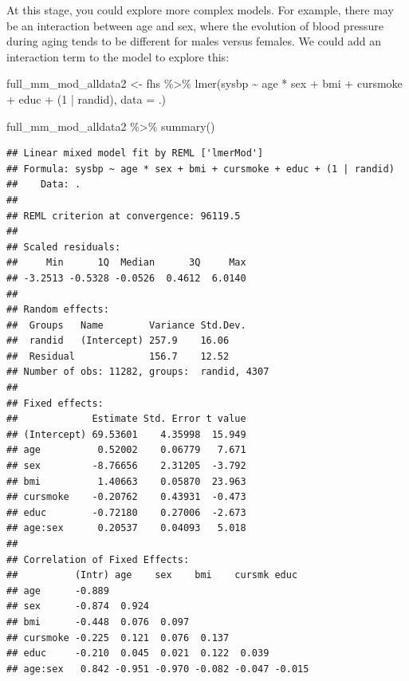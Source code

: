 \documentclass[
]{book}
\newenvironment{Shaded}{\begin{snugshade}}{\end{snugshade}}
\newcommand{\AttributeTok}[1]{\textcolor[rgb]{0.77,0.63,0.00}{#1}}
\newcommand{\DecValTok}[1]{\textcolor[rgb]{0.00,0.00,0.81}{#1}}
\newcommand{\FunctionTok}[1]{\textcolor[rgb]{0.00,0.00,0.00}{#1}}
\newcommand{\NormalTok}[1]{#1}
\newcommand{\OtherTok}[1]{\textcolor[rgb]{0.56,0.35,0.01}{#1}}
\newcommand{\SpecialCharTok}[1]{\textcolor[rgb]{0.00,0.00,0.00}{#1}}
\begin{document}
At this stage, you could explore more complex models. For example, there
may be an interaction between age and sex, where the evolution of blood pressure
during aging tends to be different for males versus females. We could add
an interaction term to the model to explore this:

\begin{Shaded}
\begin{Highlighting}[]
\NormalTok{full\_mm\_mod\_alldata2 }\OtherTok{\textless{}{-}}\NormalTok{ fhs }\SpecialCharTok{\%\textgreater{}\%} 
  \FunctionTok{lmer}\NormalTok{(sysbp }\SpecialCharTok{\textasciitilde{}}\NormalTok{ age }\SpecialCharTok{*}\NormalTok{ sex }\SpecialCharTok{+}\NormalTok{ bmi }\SpecialCharTok{+}\NormalTok{ cursmoke }\SpecialCharTok{+}\NormalTok{ educ }\SpecialCharTok{+}\NormalTok{ (}\DecValTok{1} \SpecialCharTok{|}\NormalTok{ randid), }
       \AttributeTok{data =}\NormalTok{ .) }

\NormalTok{full\_mm\_mod\_alldata2 }\SpecialCharTok{\%\textgreater{}\%} 
  \FunctionTok{summary}\NormalTok{()}
\end{Highlighting}
\end{Shaded}

\begin{verbatim}
## Linear mixed model fit by REML ['lmerMod']
## Formula: sysbp ~ age * sex + bmi + cursmoke + educ + (1 | randid)
##    Data: .
## 
## REML criterion at convergence: 96119.5
## 
## Scaled residuals: 
##     Min      1Q  Median      3Q     Max 
## -3.2513 -0.5328 -0.0526  0.4612  6.0140 
## 
## Random effects:
##  Groups   Name        Variance Std.Dev.
##  randid   (Intercept) 257.9    16.06   
##  Residual             156.7    12.52   
## Number of obs: 11282, groups:  randid, 4307
## 
## Fixed effects:
##             Estimate Std. Error t value
## (Intercept) 69.53601    4.35998  15.949
## age          0.52002    0.06779   7.671
## sex         -8.76656    2.31205  -3.792
## bmi          1.40663    0.05870  23.963
## cursmoke    -0.20762    0.43931  -0.473
## educ        -0.72180    0.27006  -2.673
## age:sex      0.20537    0.04093   5.018
## 
## Correlation of Fixed Effects:
##          (Intr) age    sex    bmi    cursmk educ  
## age      -0.889                                   
## sex      -0.874  0.924                            
## bmi      -0.448  0.076  0.097                     
## cursmoke -0.225  0.121  0.076  0.137              
## educ     -0.210  0.045  0.021  0.122  0.039       
## age:sex   0.842 -0.951 -0.970 -0.082 -0.047 -0.015
\end{verbatim}
\end{document}
